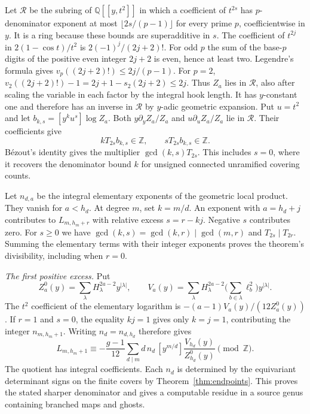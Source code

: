 Let \(\mathcal R\) be the subring of \(\mathbb Q[[y,t^2]]\) in which a coefficient of \(t^{2s}\) has \(p\)-denominator exponent at most \(\lfloor 2s/(p-1)\rfloor\) for every prime \(p\), coefficientwise in \(y\). It is a ring because these bounds are superadditive in \(s\). The coefficient of \(t^{2j}\) in \(2(1-\cos t)/t^2\) is \(2(-1)^j/(2j+2)!\). For odd \(p\) the sum of the base-\(p\) digits of the positive even integer \(2j+2\) is even, hence at least two. Legendre's formula gives \(v_p((2j+2)!)\le 2j/(p-1)\). For \(p=2\), \(v_2((2j+2)!)-1=2j+1-s_2(2j+2)\le2j\). Thus \(Z_a\) lies in \(\mathcal R\), also after scaling the variable in each factor by the integral hook length. It has \(y\)-constant one and therefore has an inverse in \(\mathcal R\) by \(y\)-adic geometric expansion. Put \(u=t^2\) and let \(b_{k,s}=[y^ku^s]\log Z_a\). Both \(y\partial_y Z_a/Z_a\) and \(u\partial_u Z_a/Z_a\) lie in \(\mathcal R\). Their coefficients give
\[k T_{2s} b_{k,s}\in\mathbb Z,\qquad
       s T_{2s} b_{k,s}\in\mathbb Z .\]
Bézout's identity gives the multiplier \(\gcd(k,s)T_{2s}\). This includes \(s=0\), where it recovers the denominator bound \(k\) for unsigned connected unramified covering counts.

Let \(n_{d,a}\) be the integral elementary exponents of the geometric local product. They vanish for \(a<h_d\). At degree \(m\), set \(k=m/d\). An exponent with \(a=h_d+j\) contributes to \(L_{m,h_m+r}\) with relative excess \(s=r-kj\). Negative \(s\) contributes zero. For \(s\ge0\) we have \(\gcd(k,s)=\gcd(k,r)\mid\gcd(m,r)\) and \(T_{2s}\mid T_{2r}\). Summing the elementary terms with their integer exponents proves the theorem's divisibility, including when \(r=0\).

\emph{The first positive excess.} Put
\[Z_a^0(y)=\sum_\lambda H_\lambda^{2a-2}y^{|\lambda|},
 \qquad V_a(y)=\sum_\lambda H_\lambda^{2a-2}
                      \Big(\sum_{b\in\lambda}\ell_b^2\Big)y^{|\lambda|}.\]
The \(t^2\) coefficient of the elementary logarithm is
\(-(a-1)V_a(y)/(12Z_a^0(y))\). If \(r=1\) and \(s=0\), the equality \(kj=1\) gives only \(k=j=1\), contributing the integer \(n_{m,h_m+1}\). Writing \(n_d=n_{d,h_d}\) therefore gives
\[L_{m,h_m+1}\equiv-\frac{g-1}{12}
   \sum_{d\mid m}d\,n_d\,[y^{m/d}]\frac{V_{h_d}(y)}{Z_{h_d}^0(y)}
     \pmod{\mathbb Z}.\]
The quotient has integral coefficients. Each \(n_d\) is determined by the equivariant determinant signs on the finite covers by Theorem~\ref{thm:endpoints}. This proves the stated sharper denominator and gives a computable residue in a source genus containing branched maps and ghosts.

